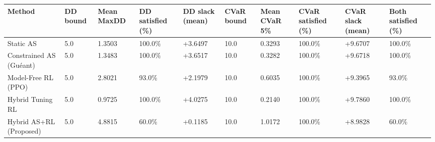 \begin{tabular}{llllllllll}
\toprule
Method & DD bound & Mean MaxDD & DD satisfied (\%) & DD slack (mean) & CVaR bound & Mean CVaR 5\% & CVaR satisfied (\%) & CVaR slack (mean) & Both satisfied (\%) \\
\midrule
Static AS & 5.0 & 1.3503 & 100.0\% & +3.6497 & 10.0 & 0.3293 & 100.0\% & +9.6707 & 100.0\% \\
Constrained AS (Guéant) & 5.0 & 1.3483 & 100.0\% & +3.6517 & 10.0 & 0.3282 & 100.0\% & +9.6718 & 100.0\% \\
Model-Free RL (PPO) & 5.0 & 2.8021 & 93.0\% & +2.1979 & 10.0 & 0.6035 & 100.0\% & +9.3965 & 93.0\% \\
Hybrid Tuning RL & 5.0 & 0.9725 & 100.0\% & +4.0275 & 10.0 & 0.2140 & 100.0\% & +9.7860 & 100.0\% \\
Hybrid AS+RL (Proposed) & 5.0 & 4.8815 & 60.0\% & +0.1185 & 10.0 & 1.0172 & 100.0\% & +8.9828 & 60.0\% \\
\bottomrule
\end{tabular}
